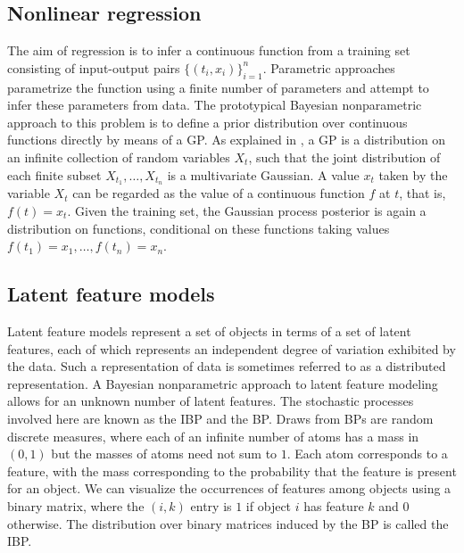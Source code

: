 \subsection{Nonlinear regression}
The aim of regression is to infer a continuous function from a training set consisting of input-output pairs $\{(t_i , x_i )\}_{i=1}^n$. Parametric approaches parametrize the function using a finite number of parameters and attempt to infer these parameters from data. The prototypical Bayesian nonparametric approach to this problem is to define a prior distribution over continuous functions directly by means of a \gls{GP}. As explained in \cite{Rasmussen:2005:GPM:1162254}, a \gls{GP} is a distribution on an infinite collection of random variables $X_t$, such that the joint distribution of each finite subset $X_{t_1},\dots, X_{t_n}$ is a multivariate Gaussian. A value $x_t$ taken by the variable $X_t$ can be regarded as the value of a continuous function $f$ at $t$, that is, $f(t) = x_t$. Given the training set, the Gaussian process posterior is again a distribution on functions, conditional on these functions taking values $f(t_1)=x_1,\dots,f(t_n)=x_n$.

\subsection{Latent feature models}
Latent feature models represent a set of objects in terms of a set of latent features, each of which represents an independent degree of variation exhibited by the data. Such a representation of data is sometimes referred to as a distributed representation. %
A Bayesian nonparametric approach to latent feature modeling allows for an unknown number of latent features.
The stochastic processes involved here are known as the \gls{IBP} and the \gls{BP}. Draws from \glspl{BP} are random discrete measures, where each of an infinite number of atoms has a mass in $(0,1)$ but the masses of atoms need not sum to $1$. Each atom corresponds to a feature, with the mass corresponding to the probability that the feature is present for an object. We can visualize the occurrences of features among objects using a binary matrix, where the $(i,k)$ entry is $1$ if object $i$ has feature $k$ and $0$ otherwise. The distribution over binary matrices induced by the \gls{BP} is called the \gls{IBP}.

